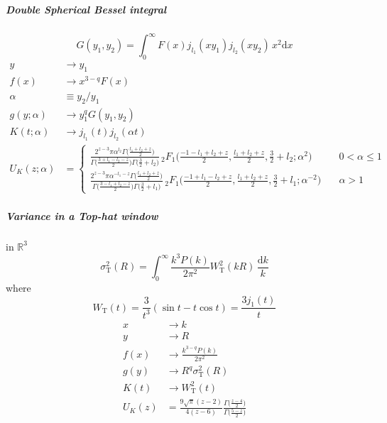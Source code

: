 \documentclass{article}
\renewcommand{\d}{\mathrm{d}}
\newcommand{\Mellin}{U}
\newcommand{\Tophat}{\textrm{T}}
\begin{document}
\subparagraph{Double Spherical Bessel integral}
\begin{equation}
    G(y_1, y_2) = \int_0^\infty F(x) j_{l_1}(xy_1) j_{l_2}(xy_2) \,x^2\d x
\end{equation}
\begin{align}
    y &\to y_1  \\
    f(x) &\to x^{3-q} F(x)  \\
    \alpha &\equiv y_2/y_1  \\
    g(y; \alpha) &\to y_1^q G(y_1, y_2)  \\
    K(t;\alpha) &\to j_{l_1}(t) j_{l_2}(\alpha t)  \\
    \Mellin_K(z;\alpha) &=
    \begin{cases}
        \frac{2^{z-3} \pi \alpha^{l_2} \Gamma\bigl(\frac{l_1+l_2+z}2\bigr)}
            {\Gamma\bigl(\frac{3+l_1-l_2-z}2\bigr) \Gamma\bigl(\frac32+l_2\bigr)}
        \,_2F_1\bigl( \frac{-1-l_1+l_2+z}2, \frac{l_1+l_2+z}2, \frac32+l_2; \alpha^2 \bigr)
        & \quad 0<\alpha\leq1  \\
        \frac{2^{z-3} \pi \alpha^{-l_1-z} \Gamma\bigl(\frac{l_1+l_2+z}2\bigr)}
            {\Gamma\bigl(\frac{3-l_1+l_2-z}2\bigr) \Gamma\bigl(\frac32+l_1\bigr)}
        \,_2F_1\bigl( \frac{-1+l_1-l_2+z}2, \frac{l_1+l_2+z}2, \frac32+l_1; \alpha^{-2} \bigr)
        & \quad \alpha>1
    \end{cases}
\end{align}


\subparagraph{Variance in a Top-hat window}
in $\mathbb{R}^3$
\begin{equation}
    \sigma_\Tophat^2(R) = \int_0^\infty \frac{k^3P(k)}{2\pi^2} W_\Tophat^2(kR) \,\frac{\d k}k
\end{equation}
where
\begin{equation}
    W_\Tophat(t) = \frac3{t^3}(\sin t - t\cos t) = \frac{3j_1(t)}t
\end{equation}
\begin{align}
    x &\to k  \\
    y &\to R  \\
    f(x) &\to \frac{k^{3-q}P(k)}{2\pi^2}  \\
    g(y) &\to R^q \sigma_\Tophat^2(R)  \\
    K(t) &\to W_\Tophat^2(t)  \\
    \Mellin_K(z) &= \frac{9\sqrt{\pi}(z-2)}{4(z-6)}
        \frac{\Gamma\bigl(\frac{z-4}2\bigr)}{\Gamma\bigl(\frac{5-z}2\bigr)}
\end{align}
\end{document}
